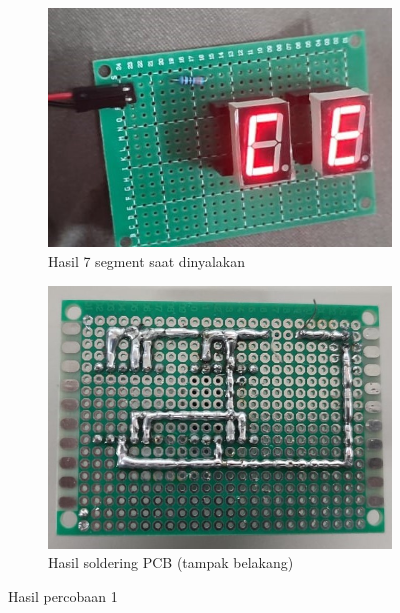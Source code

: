 \begin{figure}[H]
  \centering
  \begin{subfigure}[c]{0.4\linewidth}
    \centering
    \includegraphics[width=\linewidth]{img/modul_2/percobaan1_hasil.jpg}
    \caption{Hasil 7 segment saat dinyalakan\label{fig:inisub1}}
  \end{subfigure}
  \hspace{1cm}
  \begin{subfigure}[c]{0.4\linewidth}
    \centering
    \includegraphics[width=\linewidth]{img/modul_2/percobaan1_hasil_solder.jpg}
    \caption{Hasil soldering PCB (tampak belakang) \label{fig:inisub2}}
  \end{subfigure}
  \caption{Hasil percobaan 1 \label{fig:keduagambar}}
\end{figure}


